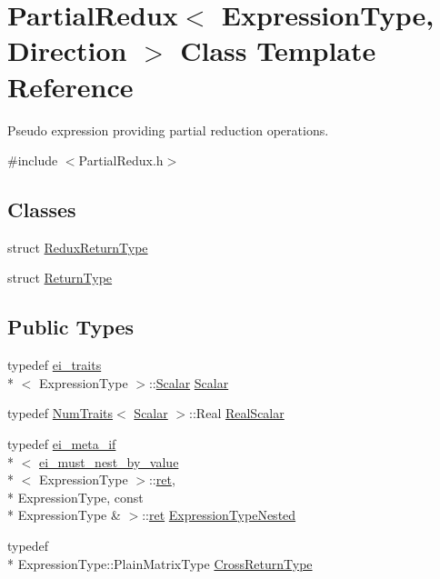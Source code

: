 \hypertarget{class_partial_redux}{\section{Partial\-Redux$<$ Expression\-Type, Direction $>$ Class Template Reference}
\label{class_partial_redux}
}


Pseudo expression providing partial reduction operations.  




{\ttfamily \#include $<$Partial\-Redux.\-h$>$}

\subsection*{Classes}
\begin{DoxyCompactItemize}
\item 
struct \hyperlink{struct_partial_redux_1_1_redux_return_type}{Redux\-Return\-Type}
\item 
struct \hyperlink{struct_partial_redux_1_1_return_type}{Return\-Type}
\end{DoxyCompactItemize}
\subsection*{Public Types}
\begin{DoxyCompactItemize}
\item 
typedef \hyperlink{structei__traits}{ei\-\_\-traits}\\*
$<$ Expression\-Type $>$\-::\hyperlink{class_partial_redux_a5884ea45b5cd9ba86feef9193cf56fa8}{Scalar} \hyperlink{class_partial_redux_a5884ea45b5cd9ba86feef9193cf56fa8}{Scalar}
\item 
typedef \hyperlink{struct_num_traits}{Num\-Traits}$<$ \hyperlink{class_partial_redux_a5884ea45b5cd9ba86feef9193cf56fa8}{Scalar} $>$\-::Real \hyperlink{class_partial_redux_ab90e980b51024c769907a8646b38c713}{Real\-Scalar}
\item 
typedef \hyperlink{structei__meta__if}{ei\-\_\-meta\-\_\-if}\\*
$<$ \hyperlink{structei__must__nest__by__value}{ei\-\_\-must\-\_\-nest\-\_\-by\-\_\-value}\\*
$<$ Expression\-Type $>$\-::\hyperlink{group___i_p_conn_plugin_gabc99fe6afec1a75ccff1092e47375a40}{ret}, \\*
Expression\-Type, const \\*
Expression\-Type \& $>$\-::\hyperlink{group___i_p_conn_plugin_gabc99fe6afec1a75ccff1092e47375a40}{ret} \hyperlink{class_partial_redux_a0f17bbdfa61d2bd1e3d271dc82c595b8}{Expression\-Type\-Nested}
\item 
typedef \\*
Expression\-Type\-::\-Plain\-Matrix\-Type \hyperlink{class_partial_redux_a37567c70c25e1c7992976f173114fedb}{Cross\-Return\-Type}
\end{DoxyCompactItemize}
